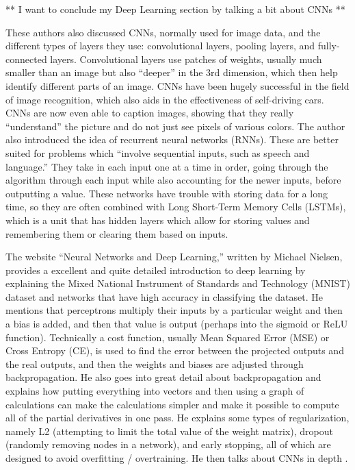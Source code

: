 \documentclass[]{report}
\begin{document}
** I want to conclude my Deep Learning section by talking a bit about CNNs **

These authors also discussed CNNs, normally used for image data, and the different types of layers they use: convolutional layers, pooling layers, and fully-connected layers. Convolutional layers use patches of weights, usually much smaller than an image but also “deeper” in the 3rd dimension, which then help identify different parts of an image. CNNs have been hugely successful in the field of image recognition, which also aids in the effectiveness of self-driving cars. CNNs are now even able to caption images, showing that they really “understand” the picture and do not just see pixels of various colors.
The author also introduced the idea of recurrent neural networks (RNNs). These are better suited for problems which “involve sequential inputs, such as speech and language.” They take in each input one at a time in order, going through the algorithm through each input while also accounting for the newer inputs, before outputting a value. These networks have trouble with storing data for a long time, so they are often combined with Long Short-Term Memory Cells (LSTMs), which is a unit that has hidden layers which allow for storing values and remembering them or clearing them based on inputs.


The website “Neural Networks and Deep Learning,” written by Michael Nielsen, provides a excellent and quite detailed introduction to deep learning by explaining the Mixed National Instrument of Standards and Technology (MNIST) dataset and networks that have high accuracy in classifying the dataset. He mentions that perceptrons multiply their inputs by a particular weight and then a bias is added, and then that value is output (perhaps into the sigmoid or ReLU function). Technically a cost function, usually Mean Squared Error (MSE) or Cross Entropy (CE), is used to find the error between the projected outputs and the real outputs, and then the weights and biases are adjusted through backpropagation. He also goes into great detail about backpropagation and explains how putting everything into vectors and then using a graph of calculations can make the calculations simpler and make it possible to compute all of the partial derivatives in one pass. He explains some types of regularization, namely L2 (attempting to limit the total value of the weight matrix), dropout (randomly removing nodes in a network), and early stopping, all of which are designed to avoid overfitting / overtraining. He then talks about CNNs in depth \cite{NNDL}.
\end{document}
